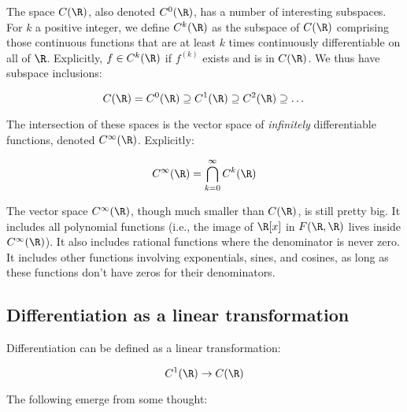 \documentclass[10pt]{amsart}
\begin{document}
The space $C(\R)$, also denoted $C^0(\R)$, has a number of interesting
subspaces. For $k$ a positive integer, we define $C^k(\R)$ as the
subspace of $C(\R)$ comprising those continuous functions that are at
least $k$ times continuously differentiable on all of
$\R$. Explicitly, $f \in C^k(\R)$ if $f^{(k)}$ exists and is in
$C(\R)$. We thus have subspace inclusions:

$$C(\R) = C^0(\R) \supseteq C^1(\R) \supseteq C^2(\R) \supseteq \dots $$

The intersection of these spaces is the vector space of {\em
  infinitely} differentiable functions, denoted $C^\infty(\R)$. Explicitly:

$$C^\infty(\R) = \bigcap_{k=0}^\infty C^k(\R)$$

The vector space $C^\infty(\R)$, though much smaller than $C(\R)$, is
still pretty big. It includes all polynomial functions (i.e., the
image of $\R[x]$ in $F(\R,\R)$ lives inside $C^\infty(\R)$). It also
includes rational functions where the denominator is never zero. It
includes other functions involving exponentials, sines, and cosines,
as long as these functions don't have zeros for their denominators.

\subsection{Differentiation as a linear transformation}

Differentiation can be defined as a linear transformation:

$$C^1(\R) \to C(\R)$$

The following emerge from some thought:
\end{document}
